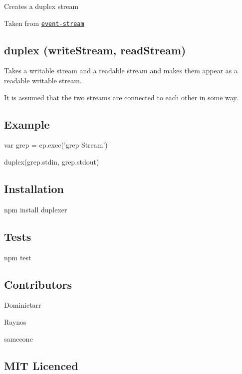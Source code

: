 \href{https://travis-ci.org/Raynos/duplexer}{\tt } \href{https://david-dm.org/Raynos/duplexer}{\tt }

\href{https://ci.testling.com/Raynos/duplexer}{\tt }

Creates a duplex stream

Taken from \href{https://github.com/dominictarr/event-stream#duplex-writestream-readstream}{\tt event-\/stream}

\subsection*{duplex (write\+Stream, read\+Stream)}

Takes a writable stream and a readable stream and makes them appear as a readable writable stream.

It is assumed that the two streams are connected to each other in some way.

\subsection*{Example}


\begin{DoxyCode}
var grep = cp.exec('grep Stream')

duplex(grep.stdin, grep.stdout)
\end{DoxyCode}


\subsection*{Installation}

{\ttfamily npm install duplexer}

\subsection*{Tests}

{\ttfamily npm test}

\subsection*{Contributors}


\begin{DoxyItemize}
\item Dominictarr
\item Raynos
\item samccone
\end{DoxyItemize}

\subsection*{M\+IT Licenced}